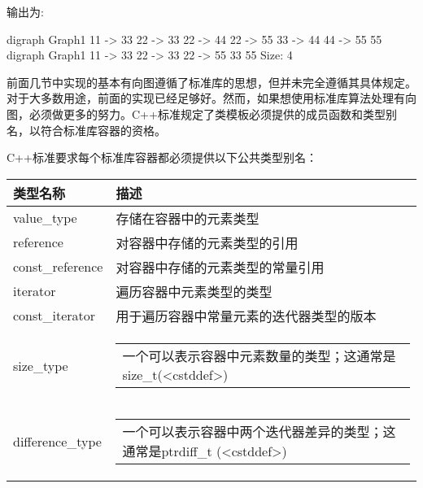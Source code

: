 输出为:

\begin{shell}
digraph Graph1 {
11 -> 33
22 -> 33
22 -> 44
22 -> 55
33 -> 44
44 -> 55
55
}
digraph Graph1 {
11 -> 33
22 -> 33
22 -> 55
33
55
}
Size: 4
\end{shell}


前面几节中实现的基本有向图遵循了标准库的思想，但并未完全遵循其具体规定。对于大多数用途，前面的实现已经足够好。然而，如果想使用标准库算法处理有向图，必须做更多的努力。C++标准规定了类模板必须提供的成员函数和类型别名，以符合标准库容器的资格。


C++标准要求每个标准库容器都必须提供以下公共类型别名：

\begin{longtable}{|l|l|}
\hline
\textbf{类型名称} & \textbf{描述}                                                     \\ \hline
\endfirsthead
%
\endhead
%
value\_type        & 存储在容器中的元素类型                                               \\ \hline
reference          & 对容器中存储的元素类型的引用                                         \\ \hline
const\_reference   & 对容器中存储的元素类型的常量引用                                     \\ \hline
iterator           & 遍历容器中元素类型的类型                                             \\ \hline
const\_iterator    & 用于遍历容器中常量元素的迭代器类型的版本                               \\ \hline
size\_type &
\begin{tabular}[c]{@{}l@{}}一个可以表示容器中元素数量的类型；这通常是size\_t(<cstddef>)\end{tabular} \\ \hline
difference\_type &
\begin{tabular}[c]{@{}l@{}}一个可以表示容器中两个迭代器差异的类型；这通常是ptrdiff\_t (<cstddef>)\end{tabular} \\ \hline
\end{longtable}

